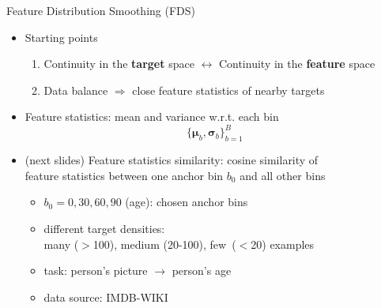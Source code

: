 \begin{frame}{Feature Distribution Smoothing (FDS)}
	\begin{itemize}\setlength\itemsep{1.5em}
		\item<2-> Starting points
		\begin{enumerate}
			\item<2-> Continuity in the \textbf{target} space $\longleftrightarrow$ Continuity in the \textbf{feature} space
			\item<3-> Data balance $\Longrightarrow$ close feature statistics of nearby targets
		\end{enumerate}
		\item<4-> Feature statistics: mean and variance w.r.t. each bin
		\begin{equation*}
			\{\bm{\mu}_b,\bm{\sigma}_b\}_{b=1}^B
		\end{equation*}
		\item<5-> (next slides) Feature statistics similarity: cosine similarity of \\feature statistics between one anchor bin $b_0$ and all other bins
		\begin{itemize}
			\item $b_0 = 0, 30, 60, 90$ (age): chosen anchor bins
			\item different target densities: \\many ($>$100), medium (20-100), few~($<$20) examples
			\item task: person's picture $\longrightarrow$ person's age
			\item data source: IMDB-WIKI
		\end{itemize}
	\end{itemize}
\end{frame}



